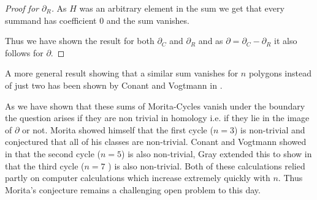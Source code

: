 \begin{proof}[Proof for $\partial_{R}$]
	As $H$ was an arbitrary element in the sum we get that every summand has coefficient $0$ and the sum vanishes.


	Thus we have shown the result for both $\partial_{C}$ and $\partial_{R}$ and as $\partial = \partial_{C} - \partial_{R}$ it also follows for $\partial$.
\end{proof}

A more general result showing that a similar sum vanishes for $n$ polygons instead of just two
has been shown by Conant and Vogtmann in \cite{conant08}.

As we have shown that these sums of Morita-Cycles vanish under the boundary the question arises if they are
non trivial in homology i.e. if they lie in the image of $\partial$ or not. 
Morita showed himself that the first cycle ($n=3$) is non-trivial and conjectured that 
all of his classes are non-trivial. Conant and Vogtmann showed in \cite{conant04} that 
the second cycle ($n=5$) is also non-trivial, Gray extended this
to show in \cite{gray11} that the third cycle ($n=7$ ) is also non-trivial.
Both of these calculations relied partly on computer calculations
which increase extremely quickly with $n$. Thus Morita's conjecture
remains a challenging open problem to this day.

\newpage
\printbibliography

%



